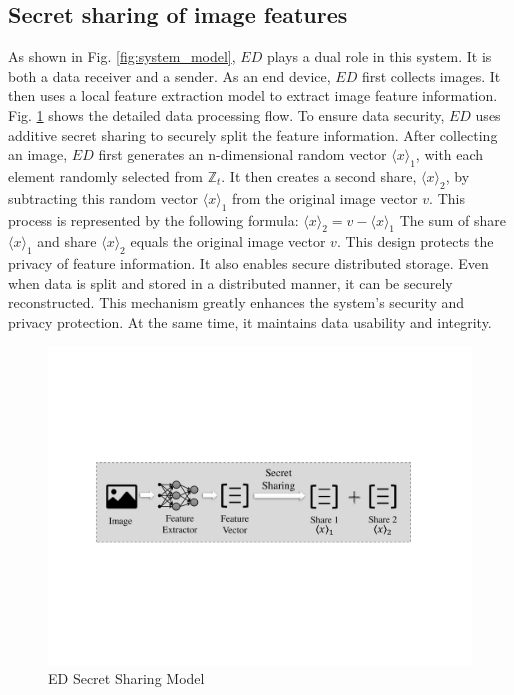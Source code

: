 ﻿\documentclass[conference]{IEEEtran}
\begin{document}
\subsection{Secret sharing of image features}

As shown in Fig. \ref{fig:system_model}, $ED$ plays a dual role in this system. It is both a data receiver and a sender. As an end device, $ED$ first collects images. It then uses a local feature extraction model to extract image feature information. Fig. \ref{fig:ED_Models} shows the detailed data processing flow. To ensure data security, $ED$ uses additive secret sharing to securely split the feature information. After collecting an image, $ED$ first generates an n-dimensional random vector $\langle x \rangle_1$, with each element randomly selected from $\mathbb{Z}_t$. It then creates a second share, $\langle x \rangle_2$, by subtracting this random vector $\langle x \rangle_1$ from the original image vector $v$. This process is represented by the following formula:
$\langle x \rangle_2 = v - \langle x \rangle_1$
The sum of share $\langle x \rangle_1$ and share $\langle x \rangle_2$ equals the original image vector $v$. This design protects the privacy of feature information. It also enables secure distributed storage. Even when data is split and stored in a distributed manner, it can be securely reconstructed. This mechanism greatly enhances the system's security and privacy protection. At the same time, it maintains data usability and integrity.

\begin{figure}[ht]
\includegraphics[width=1\linewidth]{fig2.pdf}
\caption{ED Secret Sharing Model} \label{fig:ED_Models}
\end{figure}
\end{document}
